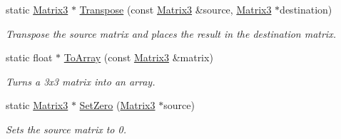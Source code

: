 \begin{DoxyCompactItemize}
static \hyperlink{class_flounder_1_1_matrix3}{Matrix3} $\ast$ \hyperlink{class_flounder_1_1_matrix3_a395d5d59957483d96f3692aed49e4b23}{Transpose} (const \hyperlink{class_flounder_1_1_matrix3}{Matrix3} \&source, \hyperlink{class_flounder_1_1_matrix3}{Matrix3} $\ast$destination)
\begin{DoxyCompactList}\small\item\em Transpose the source matrix and places the result in the destination matrix. \end{DoxyCompactList}\item 
static float $\ast$ \hyperlink{class_flounder_1_1_matrix3_a941b077fd0035c70ceebbd3262d682cd}{To\+Array} (const \hyperlink{class_flounder_1_1_matrix3}{Matrix3} \&matrix)
\begin{DoxyCompactList}\small\item\em Turns a 3x3 matrix into an array. \end{DoxyCompactList}\item 
static \hyperlink{class_flounder_1_1_matrix3}{Matrix3} $\ast$ \hyperlink{class_flounder_1_1_matrix3_adc1f06f22bf3369ac4e6111392de5ef0}{Set\+Zero} (\hyperlink{class_flounder_1_1_matrix3}{Matrix3} $\ast$source)
\begin{DoxyCompactList}\small\item\em Sets the source matrix to 0. \end{DoxyCompactList}\end{DoxyCompactItemize}
